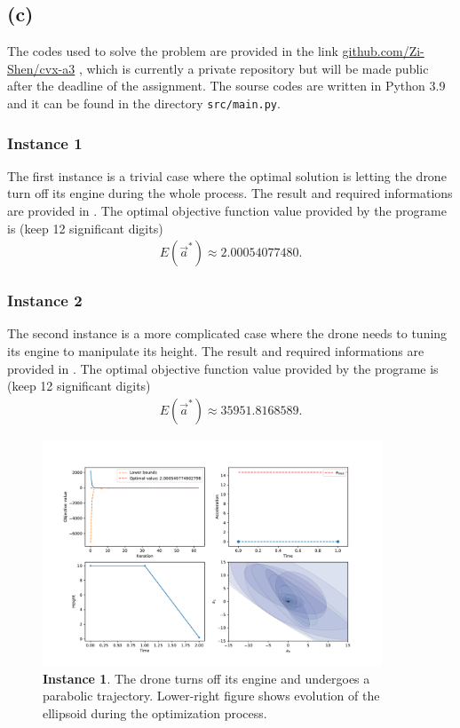 \documentclass[letterpaper,10pt]{article}
\begin{document}
\subsection{(c)}

The codes used to solve the problem are provided in the link \href{https://github.com/Zi-Shen/cvx-a3}{github.com/Zi-Shen/cvx-a3}
, which is currently a private repository but will be made public after the deadline of the assignment. The sourse codes are written in Python 3.9 and it can be found in the directory \texttt{src/main.py}.

\subsubsection*{Instance 1}

The first instance is a trivial case where the optimal solution is letting the drone turn off its engine during the whole process. The result and required informations are provided in .
The optimal objective function value provided by the programe is (keep 12 significant digits)
\begin{align}
    E(\vec a^*)\approx 2.00054077480.
\end{align}

\subsubsection*{Instance 2}

The second instance is a more complicated case where the drone needs to tuning its engine to manipulate its height. 
The result and required informations are provided in .
The optimal objective function value provided by the programe is (keep 12 significant digits)
\begin{align}
    E(\vec a^*)\approx 35951.8168589.
\end{align}

\begin{figure}
    \centering
    \includegraphics[width=0.9\textwidth]{fig/Figure_1.pdf}
    \caption{\textbf{Instance 1}. The drone turns off its engine and undergoes a parabolic trajectory. Lower-right figure shows evolution of the ellipsoid during the optimization process.}
    \label{fig:instance1}
\end{figure}
\end{document}
